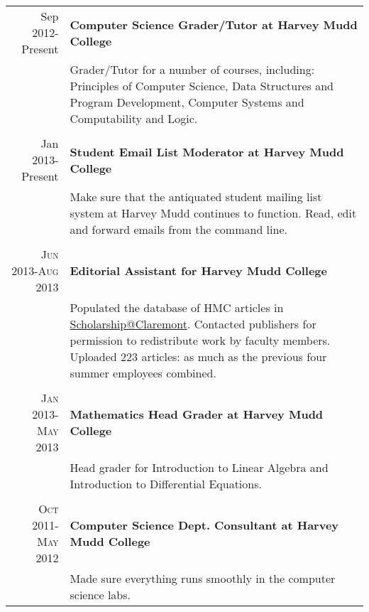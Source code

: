 \documentclass[letterpaper,10pt]{article} %
\begin{document}
\begin{tabular}{r|p{14.5cm}}
Sep 2012-Present & {\bf Computer Science Grader/Tutor at {\sc Harvey Mudd College}} \\
& Grader/Tutor for a number of courses, including: Principles of Computer Science, Data Structures and Program Development, Computer Systems and Computability and Logic.\\
\multicolumn{2}{c}{} \\


Jan 2013-Present & {\bf Student Email List Moderator at {\sc Harvey Mudd College}} \\
& Make sure that the antiquated student mailing list system at Harvey Mudd continues to function. Read, edit and forward emails from the command line.\\
\multicolumn{2}{c}{} \\


\textsc{Jun 2013-Aug 2013} & {\bf Editorial Assistant for {\sc Harvey Mudd College}}\\
& Populated the database of HMC articles in \href{scholarship.claremont.edu}{Scholarship@Claremont}. Contacted publishers for permission to redistribute work by faculty members. Uploaded 223 articles: as much as the previous four summer employees combined.\\
\multicolumn{2}{c}{} \\


\textsc{Jan 2013-May 2013} & {\bf Mathematics Head Grader at {\sc Harvey Mudd College}}\\
& Head grader for Introduction to Linear Algebra and Introduction to Differential Equations.\\
\multicolumn{2}{c}{}\\


\textsc{Oct 2011-May 2012} & {\bf Computer Science Dept. Consultant at {\sc Harvey Mudd College}}\\
& Made sure everything runs smoothly in the computer science labs.
\end{tabular}


\end{document}
